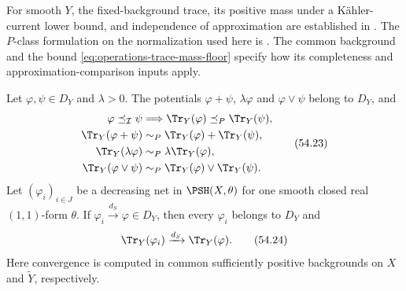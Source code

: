 For smooth $Y$, the fixed-background trace, its positive mass under
a K\"ahler-current lower bound, and independence of approximation are
established in
\cite[Definition~3.1 and Lemmas~3.2--3.4]{DXTraceV2}.
The $P$-class formulation on the normalization used here is
\cite[Propositions~8.1.1--8.1.2 and 8.2.1]{XiaBook}.
The common background and the bound
\eqref{eq:operations-trace-mass-floor} specify how its completeness
and approximation-comparison inputs apply.


\begin{proposition}\label{prop:operations-trace-calculus}
Let $\varphi,\psi\in D_Y$ and $\lambda>0$.  The potentials
$\varphi+\psi$, $\lambda\varphi$ and $\varphi\vee\psi$ belong to $D_Y$,
and
\[
 \begin{split}
 \varphi\preceq_{\mathcal I}\psi
 &\Longrightarrow
 \Tr_Y(\varphi)\preceq_P\Tr_Y(\psi),\\
 \Tr_Y(\varphi+\psi)
 &\sim_P\Tr_Y(\varphi)+\Tr_Y(\psi),\\
 \Tr_Y(\lambda\varphi)
 &\sim_P\lambda\Tr_Y(\varphi),\\
 \Tr_Y(\varphi\vee\psi)
 &\sim_P\Tr_Y(\varphi)\vee\Tr_Y(\psi).
 \end{split}
\tag{54.23}\label{eq:operations-trace-calculus}
\]
Let $(\varphi_i)_{i\in J}$ be a decreasing net in
$\PSH(X,\theta)$ for one smooth closed real $(1,1)$-form $\theta$.
If $\varphi_i\xrightarrow{d_S}\varphi\in D_Y$, then every
$\varphi_i$ belongs to $D_Y$ and
\[
                  \Tr_Y(\varphi_i)
                  \xrightarrow{d_S}\Tr_Y(\varphi).
\tag{54.24}\label{eq:operations-trace-decreasing}
\]
Here convergence is computed in common sufficiently positive
backgrounds on $X$ and $\widetilde Y$, respectively.
\end{proposition}

